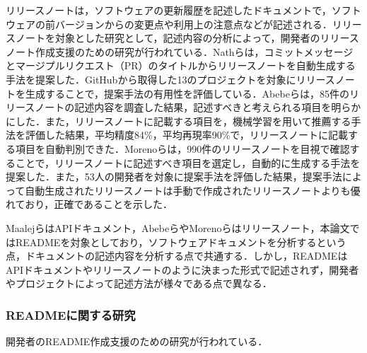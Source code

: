 \documentclass[submit]{ipsj}
\begin{document}
リリースノートは，ソフトウェアの更新履歴を記述したドキュメントで，ソフトウェアの前バージョンからの変更点や利用上の注意点などが記述される．リリースノートを対象とした研究として，記述内容の分析によって，開発者のリリースノート作成支援のための研究が行われている．Nathらは，コミットメッセージとマージプルリクエスト（PR）のタイトルからリリースノートを自動生成する手法を提案した\cite{RN_gen}．GitHubから取得した13のプロジェクトを対象にリリースノートを生成することで，提案手法の有用性を評価している．Abebeらは，85件のリリースノートの記述内容を調査した結果，記述すべきと考えられる項目を明らかにした．また，リリースノートに記載する項目を，機械学習を用いて推薦する手法を評価した結果，平均精度84\%，平均再現率90\%で，リリースノートに記載する項目を自動判別できた\cite{Ikeda_1_Abebe_note}．Morenoらは，990件のリリースノートを目視で確認することで，リリースノートに記述すべき項目を選定し，自動的に生成する手法を提案した\cite{Ikeda_11_Moreno_note}．また，53人の開発者を対象に提案手法を評価した結果，提案手法によって自動生成されたリリースノートは手動で作成されたリリースノートよりも優れており，正確であることを示した．

MaalejらはAPIドキュメント，AbebeらやMorenoらはリリースノート，本論文ではREADMEを対象としており，ソフトウェアドキュメントを分析するという点，ドキュメントの記述内容を分析する点で共通する．しかし，READMEはAPIドキュメントやリリースノートのように決まった形式で記述されず，開発者やプロジェクトによって記述方法が様々である点で異なる．

\subsubsection{READMEに関する研究}
開発者のREADME作成支援のための研究が行われている．
\end{document}
